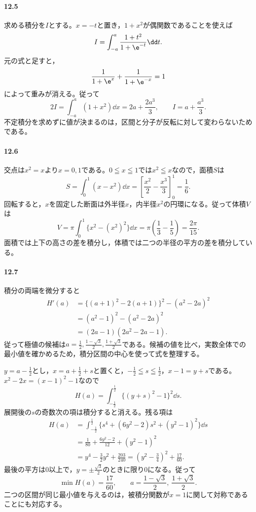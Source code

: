 \paragraph{12.5}
求める積分を$I$とする。$x=-t$と置き，$1+x^2$が偶関数であることを使えば
\[
 I=\int_{-a}^{a}\frac{1+t^2}{1+\e^{-t}}\dd t.
\]
元の式と足すと，
\[
 \frac1{1+\e^x}+\frac1{1+\e^{-x}}=1
\]
によって重みが消える。従って
\[
 2I=\int_{-a}^{a}(1+x^2)\dd x
 =2a+\frac{2a^3}{3},\qquad
 \boxed{I=a+\frac{a^3}{3}}.
\]
不定積分を求めずに値が決まるのは，区間と分子が反転に対して変わらないためである。

\paragraph{12.6}
交点は$x^2=x$より$x=0,1$である。$0\leqq x\leqq1$では$x^2\leqq x$なので，面積$S$は
\[
 S=\int_0^1(x-x^2)\dd x
 =\left[\frac{x^2}{2}-\frac{x^3}{3}\right]_0^1
 =\boxed{\frac16}.
\]
回転すると，$x$を固定した断面は外半径$x$，内半径$x^2$の円環になる。従って体積$V$は
\[
 V=\pi\int_0^1\{x^2-(x^2)^2\}\dd x
 =\pi\left(\frac13-\frac15\right)
 =\boxed{\frac{2\pi}{15}}.
\]
面積では上下の高さの差を積分し，体積では二つの半径の平方の差を積分している。

\paragraph{12.7}
積分の両端を微分すると
\[
 \begin{aligned}
 H'(a)&=\{(a+1)^2-2(a+1)\}^2-(a^2-2a)^2\\
 &=(a^2-1)^2-(a^2-2a)^2\\
 &=(2a-1)(2a^2-2a-1).
 \end{aligned}
\]
従って極値の候補は$a=\frac12,\frac{1-\sqrt3}{2},\frac{1+\sqrt3}{2}$である。候補の値を比べ，実数全体での最小値を確かめるため，積分区間の中心を使って式を整理する。

$y=a-\frac12$とし，$x=a+\frac12+s$と置くと，$-\frac12\leqq s\leqq\frac12$，$x-1=y+s$である。$x^2-2x=(x-1)^2-1$なので
\[
 H(a)=\int_{-\frac12}^{\frac12}\{(y+s)^2-1\}^2\dd s.
\]
展開後の$s$の奇数次の項は積分すると消える。残る項は
\[
 \begin{aligned}
 H(a)
 &=\int_{-\frac12}^{\frac12}
   \{s^4+(6y^2-2)s^2+(y^2-1)^2\}\dd s\\
 &=\frac1{80}+\frac{6y^2-2}{12}+(y^2-1)^2\\
 &=y^4-\frac32y^2+\frac{203}{240}
 =\left(y^2-\frac34\right)^2+\frac{17}{60}.
 \end{aligned}
\]
最後の平方は$0$以上で，$y=\pm\frac{\sqrt3}{2}$のときに限り$0$になる。従って
\[
 \boxed{\min H(a)=\frac{17}{60},\qquad
 a=\frac{1-\sqrt3}{2},\ \frac{1+\sqrt3}{2}}.
\]
二つの区間が同じ最小値を与えるのは，被積分関数が$x=1$に関して対称であることにも対応する。


